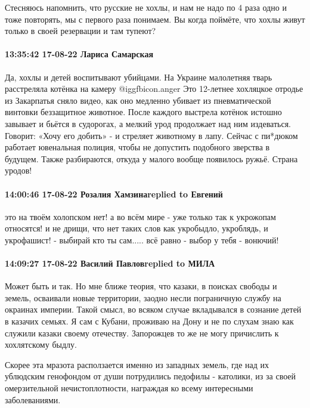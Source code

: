 Стесняюсь напомнить, что русские не хохлы, и нам не надо по 4 раза одно и тоже
повторять, мы с первого раза понимаем.
Вы когда поймёте, что хохлы живут только в своей резервации и там тупеют?

\paragraph{13:35:42 17-08-22 Лариса Самарская}

\obeycr
Да, хохлы и детей воспитывают убийцами.
На Украине малолетняя тварь расстреляла котёнка на камеру @igg{fbicon.anger} 
Это 12-летнее хохляцкое отродье из Закарпатья сняло видео, как оно медленно убивает из пневматической винтовки беззащитное животное.
После каждого выстрела котёнок истошно завывает и бьётся в судорогах, а мелкий урод продолжает над ним издеваться. Говорит: «Хочу его добить» - и стреляет животному в лапу.
Сейчас с пи*дюком работает ювенальная полиция, чтобы не допустить подобного зверства в будущем. Также разбираются, откуда у малого вообще появилось ружьё.
Страна уродов!🤬
\restorecr

\paragraph{14:00:46 17-08-22 Розалия Хамзинаreplied to Евгений}

это на твоём холопском нет! а во всём мире - уже только так к укрожопам
относятся! и не дрищи, что нет таких слов как укробыдло, укроблядь, и
укрофашист! - выбирай кто ты сам..... всё равно - выбор у тебя - вонючий!

\paragraph{14:09:27 17-08-22 Василий Павловreplied to МИЛА}

Может быть и так. Но мне ближе теория, что казаки, в поисках свободы и земель,
осваивали новые территории, заодно несли пограничную службу на окраинах
империи. Такой смысл, во всяком случае вкладывался в сознание детей в казачих
семьях. Я сам с Кубани, проживаю на Дону и не по слухам знаю как служили казаки
своему отечеству. Запорожцев то же не могу причислить к хохлятскому быдлу.

Скорее эта мразота расползается именно из западных земель, где над их ублюдским
генофондом от души потрудились педофилы - католики, из за своей омерзительной
нечистоплотности, награждая ко всему интересными заболеваниями.

